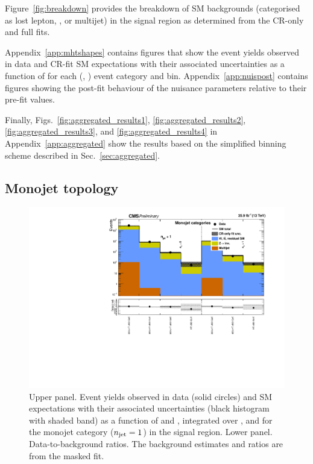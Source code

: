 Figure~\ref{fig:breakdown} provides the breakdown of SM backgrounds
(categorised as lost lepton, \znunuj, or multijet) in the signal
region as determined from the CR-only and full fits.

Appendix~\ref{app:mhtshapes} contains figures that show the event
yields observed in data and CR-fit SM expectations with their
associated uncertainties as a function of \HTmiss for each (\njet,
\nb) event category and \scalht bin. Appendix~\ref{app:nuispost}
contains figures showing the post-fit behaviour of the nuisance
parameters relative to their pre-fit values.

Finally, Figs.~\ref{fig:aggregated_results1},
\ref{fig:aggregated_results2}, \ref{fig:aggregated_results3}, and
\ref{fig:aggregated_results4} in Appendix~\ref{app:aggregated} show
the results based on the simplified binning scheme described in
Sec.~\ref{sec:aggregated}.

\clearpage
\subsection{Monojet topology}

\begin{figure}[h!]
  \centering
  \caption{Upper panel. Event yields observed in data (solid circles)
    and SM expectations with their associated uncertainties (black
    histogram with shaded band) as a function of \nb and \scalht,
    integrated over \mht, and for the monojet category ($n_{\text{jet}} = 1$)
    in the signal region. Lower panel. Data-to-background ratios. The
    background estimates and ratios are from the masked fit. }
  \label{fig:mr_mono_pre}
  \includegraphics[width=1.\linewidth]{figures/results/36invfb_freeze/mono/summaryPlot_Monojet_prefit}
\end{figure}

